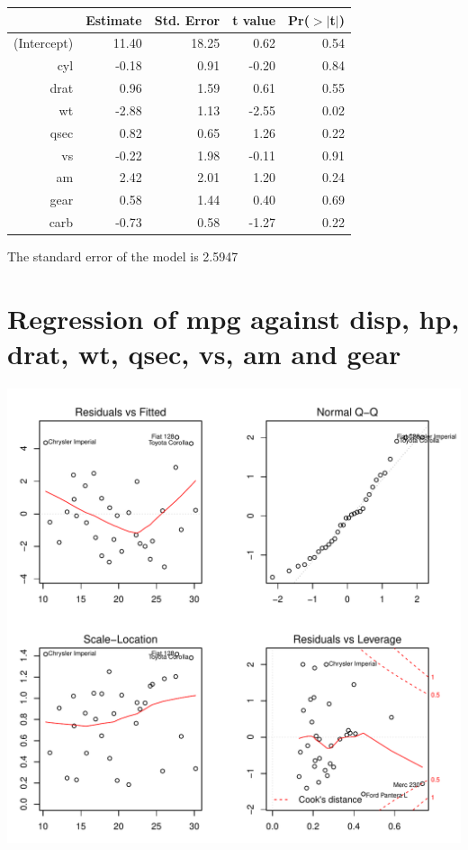 \documentclass{article}\usepackage[]{graphicx}\usepackage[]{color}
\makeatletter
\def\maxwidth{ %
  \ifdim\Gin@nat@width>\linewidth
    \linewidth
  \else
    \Gin@nat@width
  \fi
}
\newenvironment{knitrout}{}{} %
\makeatother
\begin{document}
\begin{table}[ht]
\centering
\begin{tabular}{rrrrr}
  \hline
 & Estimate & Std. Error & t value & Pr($>$$|$t$|$) \\ 
  \hline
(Intercept) & 11.40 & 18.25 & 0.62 & 0.54 \\ 
  cyl & -0.18 & 0.91 & -0.20 & 0.84 \\ 
  drat & 0.96 & 1.59 & 0.61 & 0.55 \\ 
  wt & -2.88 & 1.13 & -2.55 & 0.02 \\ 
  qsec & 0.82 & 0.65 & 1.26 & 0.22 \\ 
  vs & -0.22 & 1.98 & -0.11 & 0.91 \\ 
  am & 2.42 & 2.01 & 1.20 & 0.24 \\ 
  gear & 0.58 & 1.44 & 0.40 & 0.69 \\ 
  carb & -0.73 & 0.58 & -1.27 & 0.22 \\ 
   \hline
\end{tabular}
\end{table}




The standard error of the model is 2.5947

\newpage

\section{Regression of mpg against disp, hp, drat, wt, qsec, vs, am and gear }
\begin{knitrout}
\color{fgcolor}

{\centering \includegraphics[width=\maxwidth]{figure/lm-disp-hp-drat-wt-qsec-vs-am-gear} 

}



\end{knitrout}
\end{document}
